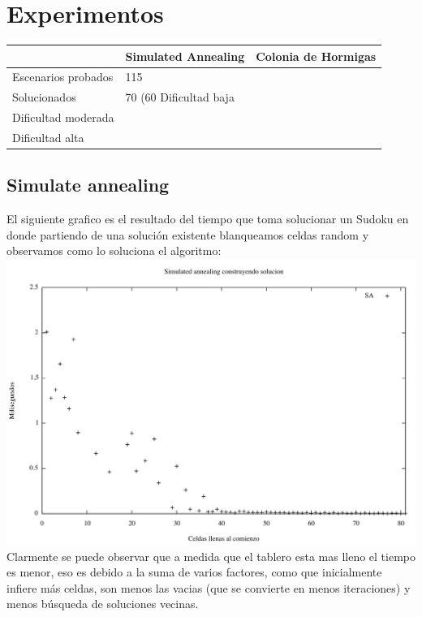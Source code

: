 \section{Experimentos}

\begin{table}
\centering
\begin{tabular}{|l|l|l|}
\hline
          & \textbf{Simulated Annealing} & \textbf{Colonia de Hormigas} \\ \hline
{Escenarios probados} &       115                       &                              \\ \hline
{Solucionados} &                      70 (60%
{Dificultad baja} &                              &                              \\ \hline
{Dificultad moderada} &                              &                              \\ \hline
{Dificultad alta} &                              &                              \\ \hline
\end{tabular}
\end{table}

\subsection{Simulate annealing}

El siguiente grafico es el resultado del tiempo que toma solucionar un Sudoku en donde partiendo de una solución existente blanqueamos celdas random y observamos como lo soluciona el algoritmo:
\includegraphics[scale=0.6]{imgs/randomSA.png}	
Clarmente se puede observar que a medida que el tablero esta mas lleno el tiempo es menor, eso es debido a la suma de varios factores, como que inicialmente infiere más celdas, son menos las vacias (que se convierte en menos iteraciones) y menos búsqueda de soluciones vecinas.

